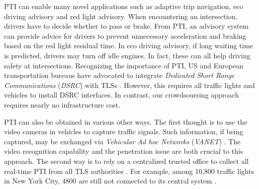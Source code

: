 \documentclass[final,oneside,onecolumn,12pt,a4paper]{book}%
\begin{document}
PTI can enable many novel applications such as adaptive trip navigation, eco
driving advisory and red light advisory. When encountering an intersection,
drivers have to decide whether to pass or brake. From PTI, an advisory system
can provide advice for drivers to prevent unnecessary acceleration and braking
based on the red light residual time. In eco driving advisory, if long waiting
time is predicted, drivers may turn off idle engines. In fact, these can all
help driving safety at intersections. Recognizing the importance of PTI, US
and European transportation bureaus have advocated to integrate
\emph{Dedicated Short Range Communications} (\emph{DSRC}) with TLSs
\cite{Baldessari2007Communication}. However, this requires all traffic lights
and vehicles to install DSRC interfaces. In contrast, our crowdsoursing
approach requires nearly no infrastructure cost.

PTI can also be obtained in various other ways. The first thought is to use
the video cameras in vehicles to capture traffic signals. Such information, if
being captured, may be exchanged via \emph{Vehicular Ad hoc Networks}
(\emph{VANET}) \cite{Koukoumidis2011SignalGuru}. The video recognition
capability and the penetration issue are both crucial to this approach. The
second way is to rely on a centralized trusted office to collect all real-time
PTI from all TLS authorities \cite{RAMS2004}. For example, among 10,800
traffic lights in New York City, 4800 are still not connected to its central
system \cite{NewYork1998}.
\end{document}

